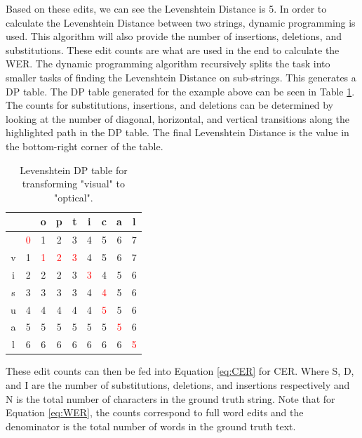 \documentclass[a4paper,11pt]{article}
\begin{document}
Based on these edits, we can see the Levenshtein Distance is 5. In order to calculate the Levenshtein Distance between two strings, dynamic programming is used. This algorithm will also provide the number of insertions, deletions, and substitutions. These edit counts are what are used in the end to calculate the WER. The dynamic programming algorithm recursively splits the task into smaller tasks of finding the Levenshtein Distance on sub-strings. This generates a DP table. The DP table generated for the example above can be seen in Table \ref{tab:levenshtein_table}. The counts for substitutions, insertions, and deletions can be determined by looking at the number of diagonal, horizontal, and vertical transitions along the highlighted path in the DP table. The final Levenshtein Distance is the value in the bottom-right corner of the table. \cite{levenshtein-dist}

\begin{table}[H]
\begin{center}
\caption{Levenshtein DP table for transforming "visual" to "optical".}
\begin{tabular}{ c|c c c c c c c c } 
  &   & o & p & t & i & c & a & l \\ \hline
  & \textcolor{red}{0} & 1 & 2 & 3 & 4 & 5 & 6 & 7 \\
 v & 1 & \textcolor{red}{1} & \textcolor{red}{2} & \textcolor{red}{3} & 4 & 5 & 6 & 7 \\
 i & 2 & 2 & 2 & 3 & \textcolor{red}{3} & 4 & 5 & 6 \\
 s & 3 & 3 & 3 & 3 & 4 & \textcolor{red}{4} & 5 & 6 \\
 u & 4 & 4 & 4 & 4 & 4 & \textcolor{red}{5} & 5 & 6 \\
 a & 5 & 5 & 5 & 5 & 5 & 5 & \textcolor{red}{5} & 6 \\
 l & 6 & 6 & 6 & 6 & 6 & 6 & 6 & \textcolor{red}{5} \\
\end{tabular}
\label{tab:levenshtein_table}
\end{center}
\end{table}

These edit counts can then be fed into Equation \ref{eq:CER} for CER. Where S, D, and I are the number of substitutions, deletions, and insertions respectively and N is the total number of characters in the ground truth string. Note that for Equation \ref{eq:WER}, the counts correspond to full word edits and the denominator is the total number of words in the ground truth text. \cite{wer-metric}
\end{document}
